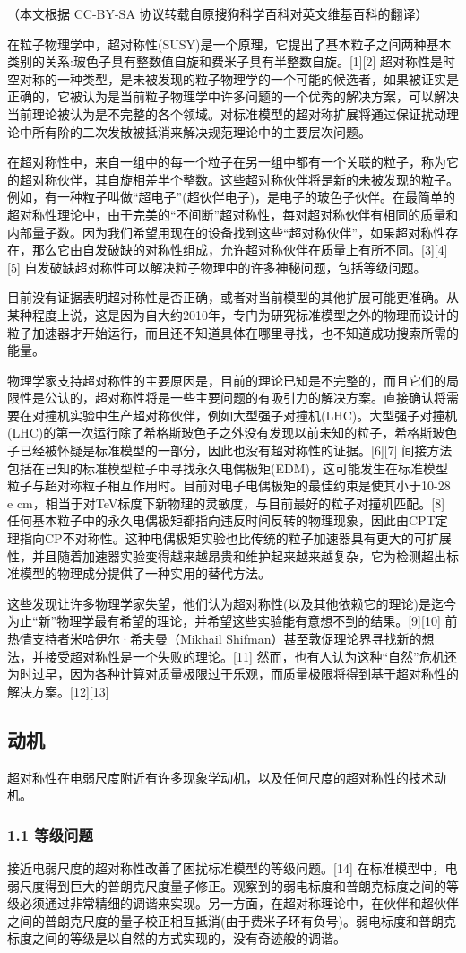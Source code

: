 
（本文根据 CC-BY-SA 协议转载自原搜狗科学百科对英文维基百科的翻译）

在粒子物理学中，超对称性(SUSY)是一个原理，它提出了基本粒子之间两种基本类别的关系:玻色子具有整数值自旋和费米子具有半整数自旋。[1][2] 超对称性是时空对称的一种类型，是未被发现的粒子物理学的一个可能的候选者，如果被证实是正确的，它被认为是当前粒子物理学中许多问题的一个优秀的解决方案，可以解决当前理论被认为是不完整的各个领域。对标准模型的超对称扩展将通过保证扰动理论中所有阶的二次发散被抵消来解决规范理论中的主要层次问题。

在超对称性中，来自一组中的每一个粒子在另一组中都有一个关联的粒子，称为它的超对称伙伴，其自旋相差半个整数。这些超对称伙伴将是新的未被发现的粒子。例如，有一种粒子叫做“超电子”(超伙伴电子)，是电子的玻色子伙伴。在最简单的超对称性理论中，由于完美的“不间断”超对称性，每对超对称伙伴有相同的质量和内部量子数。因为我们希望用现在的设备找到这些“超对称伙伴”，如果超对称性存在，那么它由自发破缺的对称性组成，允许超对称伙伴在质量上有所不同。[3][4][5] 自发破缺超对称性可以解决粒子物理中的许多神秘问题，包括等级问题。

目前没有证据表明超对称性是否正确，或者对当前模型的其他扩展可能更准确。从某种程度上说，这是因为自大约2010年，专门为研究标准模型之外的物理而设计的粒子加速器才开始运行，而且还不知道具体在哪里寻找，也不知道成功搜索所需的能量。

物理学家支持超对称性的主要原因是，目前的理论已知是不完整的，而且它们的局限性是公认的，超对称性将是一些主要问题的有吸引力的解决方案。直接确认将需要在对撞机实验中生产超对称伙伴，例如大型强子对撞机(LHC)。大型强子对撞机(LHC)的第一次运行除了希格斯玻色子之外没有发现以前未知的粒子，希格斯玻色子已经被怀疑是标准模型的一部分，因此也没有超对称性的证据。[6][7] 间接方法包括在已知的标准模型粒子中寻找永久电偶极矩(EDM)，这可能发生在标准模型粒子与超对称粒子相互作用时。目前对电子电偶极矩的最佳约束是使其小于10-28 e cm，相当于对TeV标度下新物理的灵敏度，与目前最好的粒子对撞机匹配。[8] 任何基本粒子中的永久电偶极矩都指向违反时间反转的物理现象，因此由CPT定理指向CP不对称性。这种电偶极矩实验也比传统的粒子加速器具有更大的可扩展性，并且随着加速器实验变得越来越昂贵和维护起来越来越复杂，它为检测超出标准模型的物理成分提供了一种实用的替代方法。

这些发现让许多物理学家失望，他们认为超对称性(以及其他依赖它的理论)是迄今为止“新”物理学最有希望的理论，并希望这些实验能有意想不到的结果。[9][10] 前热情支持者米哈伊尔·希夫曼（Mikhail Shifman）甚至敦促理论界寻找新的想法，并接受超对称性是一个失败的理论。[11] 然而，也有人认为这种“自然”危机还为时过早，因为各种计算对质量极限过于乐观，而质量极限将得到基于超对称性的解决方案。[12][13]

\subsection{动机}
超对称性在电弱尺度附近有许多现象学动机，以及任何尺度的超对称性的技术动机。
\subsubsection{1.1 等级问题}
接近电弱尺度的超对称性改善了困扰标准模型的等级问题。[14] 在标准模型中，电弱尺度得到巨大的普朗克尺度量子修正。观察到的弱电标度和普朗克标度之间的等级必须通过非常精细的调谐来实现。另一方面，在超对称理论中，在伙伴和超伙伴之间的普朗克尺度的量子校正相互抵消(由于费米子环有负号)。弱电标度和普朗克标度之间的等级是以自然的方式实现的，没有奇迹般的调谐。